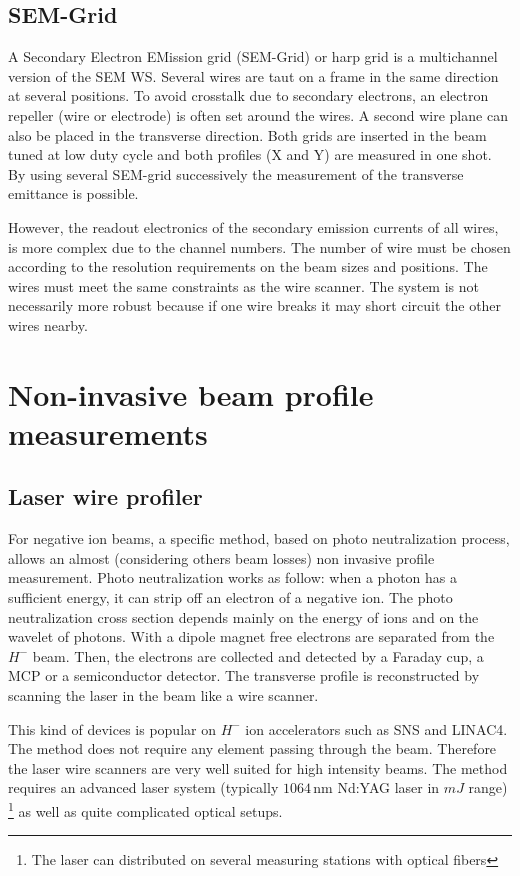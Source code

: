\begin{refsection}
  \subsection{SEM-Grid}
  A Secondary Electron EMission grid (SEM-Grid) or harp grid is a multichannel version of the SEM WS. Several wires are taut on a frame in the same direction at several positions. To avoid crosstalk due to secondary electrons, an electron repeller (wire or electrode) is often set around the wires. A second wire plane can also be placed in the transverse direction. Both grids are inserted in the beam tuned at low duty cycle and both profiles (X and Y) are measured in one shot. By using several SEM-grid successively the measurement of the transverse emittance is possible.

  However, the readout electronics of the secondary emission currents of all wires, is more complex due to the channel numbers. The number of wire must be chosen according to the resolution requirements on the beam sizes and positions. The wires must meet the same constraints as the wire scanner. The system is not necessarily more robust because if one wire breaks it may short circuit the other wires nearby.

  \section{Non-invasive beam profile measurements}
  \subsection{Laser wire profiler}
  For negative ion beams, a specific method, based on photo neutralization process, allows an almost (considering others beam losses) non invasive profile measurement. Photo neutralization works as follow: when a photon has a sufficient energy, it can strip off an electron of a negative ion.
  The photo neutralization cross section depends mainly on the energy of ions and on the wavelet of photons. With a dipole magnet free electrons are separated from the $H^-$ beam. Then, the electrons are collected and detected by a Faraday cup, a MCP or a semiconductor detector. The transverse profile is reconstructed by scanning the laser in the beam like a wire scanner.

  This kind of devices is popular on $H^-$ ion accelerators such as SNS and LINAC4. The method does not require any element passing through the beam. Therefore the laser wire scanners are very well suited for high intensity beams. The method requires an advanced laser system (typically $1064\,\mathrm{nm}$ Nd:YAG laser in $mJ$ range) \footnote{The laser can distributed on several measuring stations with optical fibers} as well as quite complicated optical setups.


\end{refsection}
